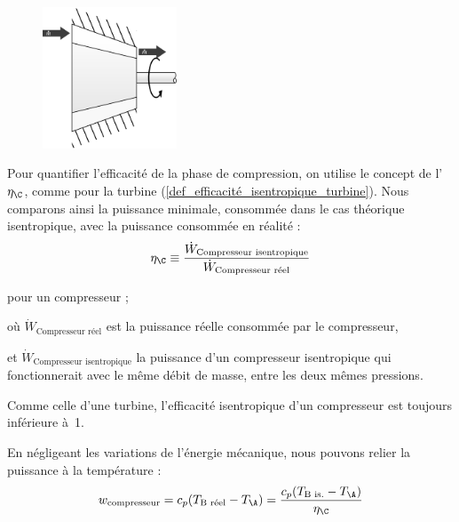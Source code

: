 		\begin{figure}
			\begin{center}
				\includegraphics[width=4cm]{images/symbole_compresseur.png}
			\end{center}
			\label{fig_schéma_compresseur2}
		\end{figure}

		Pour quantifier l’efficacité de la phase de compression, on utilise le concept de l’ $\eta_\C$, comme pour la turbine (\ref{def_efficacité_isentropique_turbine}). Nous comparons ainsi la puissance minimale, consommée dans le cas théorique isentropique, avec la puissance consommée en réalité :
		\begin{equation}
			\eta_\C \equiv  \frac{\dot{W}_\text{Compresseur isentropique}}{\dot{W}_\text{Compresseur réel}}
			\label{def_efficacité_isentropique_compresseur}
		\end{equation}

		\begin{equationterms}
			\item pour un compresseur ;
			\item où \tab $\dot{W}_\text{Compresseur réel}$ \tab\tab\tab est la puissance réelle consommée par le compresseur,
			\item et \tab $\dot{W}_\text{Compresseur isentropique}$ \tab la puissance d’un compresseur isentropique qui fonctionnerait avec le même débit de masse, entre les deux mêmes pressions.
		\end{equationterms}

		Comme celle d’une turbine, l’efficacité isentropique d’un compresseur est toujours inférieure à~1.

		En négligeant les variations de l’énergie mécanique, nous pouvons relier la puissance à la température :
		\begin{equation}
			w_\text{compresseur} = c_p (T_\text{B réel} - T_\A ) = \frac{c_p (T_\text{B is.} - T_\A )}{\eta_\C}
			\label{eq_puissance_compresseur}
		\end{equation}

